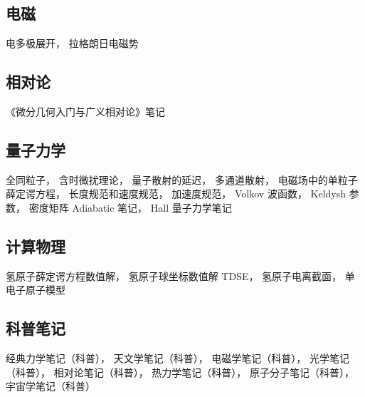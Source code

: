 \subsection{电磁}
电多极展开， 拉格朗日电磁势

\subsection{相对论}
《微分几何入门与广义相对论》笔记

\subsection{量子力学}
全同粒子， 含时微扰理论， 量子散射的延迟， 多通道散射， 电磁场中的单粒子薛定谔方程， 长度规范和速度规范， 加速度规范， Volkov 波函数， Keldysh 参数， 密度矩阵
Adiabatic 笔记，
Hall 量子力学笔记

\subsection{计算物理}
氢原子薛定谔方程数值解， 氢原子球坐标数值解 TDSE， 氢原子电离截面，  单电子原子模型

\subsection{科普笔记}
经典力学笔记（科普），
天文学笔记（科普），
电磁学笔记（科普），
光学笔记（科普），
相对论笔记（科普），
热力学笔记（科普），
原子分子笔记（科普），
宇宙学笔记（科普）
